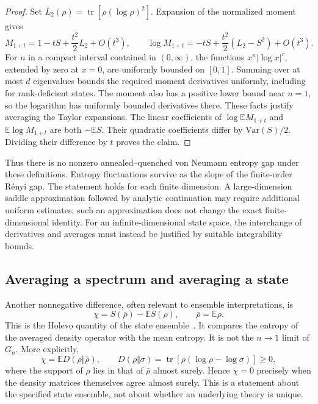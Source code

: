 \documentclass[11pt,letterpaper]{article}
\theoremstyle{plain}
\theoremstyle{definition}
\theoremstyle{remark}
\newcommand{\E}{\mathbb{E}}
\newcommand{\Var}{\text{Var}}
\DeclareMathOperator{\tr}{tr}
\begin{document}
\begin{proof}
Set $L_2(\rho)=\tr[\rho(\log\rho)^2]$.  Expansion of the normalized
moment gives
\begin{equation}
 M_{1+t}=1-tS+\frac{t^2}{2}L_2+O(t^3),\qquad
 \log M_{1+t}=-tS+\frac{t^2}{2}(L_2-S^2)+O(t^3).
 \label{eq12:moment_expansion}
\end{equation}
For $n$ in a compact interval contained in $(0,\infty)$, the functions
$x^n|\log x|^r$, extended by zero at $x=0$, are uniformly bounded on
$[0,1]$.  Summing over at most $d$ eigenvalues bounds the required
moment derivatives uniformly, including for rank-deficient states.
The moment also has a positive lower bound near $n=1$, so the logarithm
has uniformly bounded derivatives there.  These facts justify averaging
the Taylor expansions.  The linear coefficients of $\log\E M_{1+t}$
and $\E\log M_{1+t}$ are both $-\E S$.  Their quadratic coefficients
differ by $\Var(S)/2$.  Dividing their difference by $t$ proves the
claim.
\end{proof}

Thus there is no nonzero annealed--quenched von Neumann entropy gap
under these definitions.  Entropy fluctuations survive as the slope
of the finite-order R\'enyi gap.  The statement holds for each finite
dimension.  A large-dimension saddle approximation followed by analytic
continuation may require additional uniform estimates; such an
approximation does not change the exact finite-dimensional identity.
For an infinite-dimensional state space, the interchange of derivatives
and averages must instead be justified by suitable integrability bounds.

\subsection{Averaging a spectrum and averaging a state}
\label{subsec12:state_average}

Another nonnegative difference, often relevant to ensemble
interpretations, is
\begin{equation}
 \chi=S(\bar\rho)-\E S(\rho),\qquad \bar\rho=\E\rho.
 \label{eq12:holevo_quantity}
\end{equation}
This is the Holevo quantity of the state ensemble~\citep{holevo1973}.  It compares the
entropy of the averaged density operator with the mean entropy.  It
is not the $n\to1$ limit of $G_n$.  More explicitly,
\begin{equation}
 \chi=\E D(\rho\Vert\bar\rho),\qquad
 D(\rho\Vert\sigma)=\tr[\rho(\log\rho-\log\sigma)]\geq0,
 \label{eq12:relative_entropy_identity}
\end{equation}
where the support of $\rho$ lies in that of $\bar\rho$ almost surely.
Hence $\chi=0$ precisely when the density matrices themselves agree
almost surely.  This is a statement about the specified state ensemble,
not about whether an underlying theory is unique.
\end{document}
